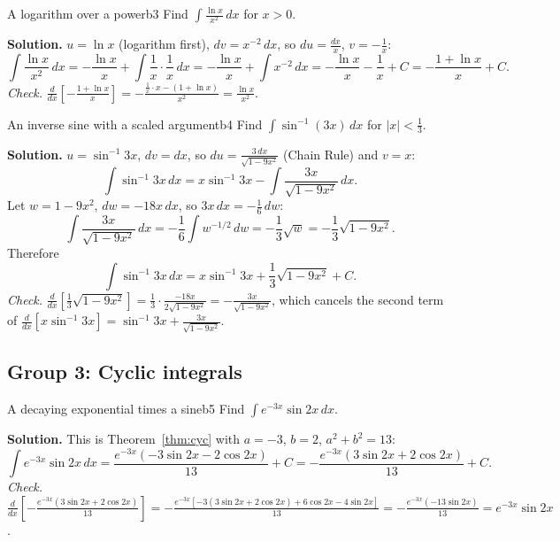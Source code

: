 \documentclass[11pt]{article}
\begin{document}
\begin{exmp}{A logarithm over a power}{b3}
Find $\int\frac{\ln x}{x^2}\,dx$ for $x>0$.

\textbf{Solution.} $u=\ln x$ (logarithm first), $dv=x^{-2}\,dx$, so $du=\frac{dx}x$, $v=-\frac1x$:
\[\int\frac{\ln x}{x^2}\,dx=-\frac{\ln x}x+\int\frac1x\cdot\frac1x\,dx=-\frac{\ln x}x+\int x^{-2}\,dx=-\frac{\ln x}x-\frac1x+C=-\frac{1+\ln x}x+C .\]
\emph{Check.} $\frac{d}{dx}\left[-\frac{1+\ln x}x\right]=-\frac{\frac1x\cdot x-(1+\ln x)}{x^2}=\frac{\ln x}{x^2}$.
\end{exmp}

\begin{exmp}{An inverse sine with a scaled argument}{b4}
Find $\int\sin^{-1}(3x)\,dx$ for $\lvert x\rvert<\frac13$.

\textbf{Solution.} $u=\sin^{-1}3x$, $dv=dx$, so $du=\frac{3\,dx}{\sqrt{1-9x^2}}$ (Chain Rule) and $v=x$:
\[\int\sin^{-1}3x\,dx=x\sin^{-1}3x-\int\frac{3x}{\sqrt{1-9x^2}}\,dx .\]
Let $w=1-9x^2$, $dw=-18x\,dx$, so $3x\,dx=-\frac16\,dw$:
\[\int\frac{3x}{\sqrt{1-9x^2}}\,dx=-\frac16\int w^{-1/2}\,dw=-\frac13\sqrt w=-\frac13\sqrt{1-9x^2} .\]
Therefore
\[\int\sin^{-1}3x\,dx=x\sin^{-1}3x+\frac13\sqrt{1-9x^2}+C .\]
\emph{Check.} $\frac{d}{dx}\left[\frac13\sqrt{1-9x^2}\right]=\frac13\cdot\frac{-18x}{2\sqrt{1-9x^2}}=-\frac{3x}{\sqrt{1-9x^2}}$, which cancels the second term of $\frac{d}{dx}\left[x\sin^{-1}3x\right]=\sin^{-1}3x+\frac{3x}{\sqrt{1-9x^2}}$.
\end{exmp}

\subsection*{Group 3: Cyclic integrals}

\begin{exmp}{A decaying exponential times a sine}{b5}
Find $\int e^{-3x}\sin2x\,dx$.

\textbf{Solution.} This is Theorem~\ref{thm:cyc} with $a=-3$, $b=2$, $a^2+b^2=13$:
\[\int e^{-3x}\sin2x\,dx=\frac{e^{-3x}\left(-3\sin2x-2\cos2x\right)}{13}+C=-\frac{e^{-3x}\left(3\sin2x+2\cos2x\right)}{13}+C .\]
\emph{Check.} $\frac{d}{dx}\left[-\frac{e^{-3x}(3\sin2x+2\cos2x)}{13}\right]=-\frac{e^{-3x}\left[-3(3\sin2x+2\cos2x)+6\cos2x-4\sin2x\right]}{13}=-\frac{e^{-3x}\left(-13\sin2x\right)}{13}=e^{-3x}\sin2x$.
\end{exmp}
\end{document}
